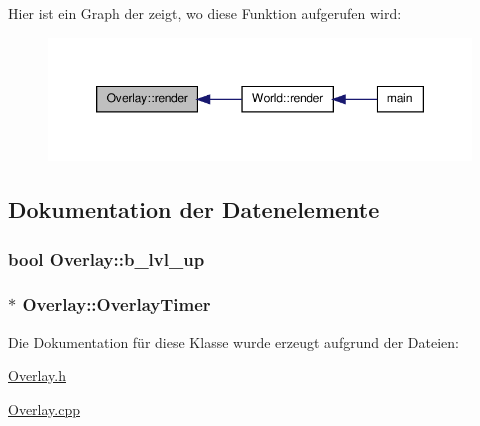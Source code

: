 Hier ist ein Graph der zeigt, wo diese Funktion aufgerufen wird\-:\nopagebreak
\begin{figure}[H]
\begin{center}
\leavevmode
\includegraphics[width=350pt]{class_overlay_ab5e47eefa2743c08bc208131c8b17a45_icgraph}
\end{center}
\end{figure}




\subsection{Dokumentation der Datenelemente}
\hypertarget{class_overlay_a57bc17bbe71de98c73f46e71519d5e43}{
\subsubsection[{b\-\_\-lvl\-\_\-up}]{\setlength{\rightskip}{0pt plus 5cm}bool Overlay\-::b\-\_\-lvl\-\_\-up\hspace{0.3cm}{\ttfamily [private]}}}\label{class_overlay_a57bc17bbe71de98c73f46e71519d5e43}
\hypertarget{class_overlay_ab45976f5ebf2c4c477402654a53a7939}{
\subsubsection[{Overlay\-Timer}]{$\ast$ Overlay\-::\-Overlay\-Timer\hspace{0.3cm}{\ttfamily [private]}}}\label{class_overlay_ab45976f5ebf2c4c477402654a53a7939}


Die Dokumentation für diese Klasse wurde erzeugt aufgrund der Dateien\-:\begin{DoxyCompactItemize}
\item 
\hyperlink{_overlay_8h}{Overlay.\-h}\item 
\hyperlink{_overlay_8cpp}{Overlay.\-cpp}\end{DoxyCompactItemize}
